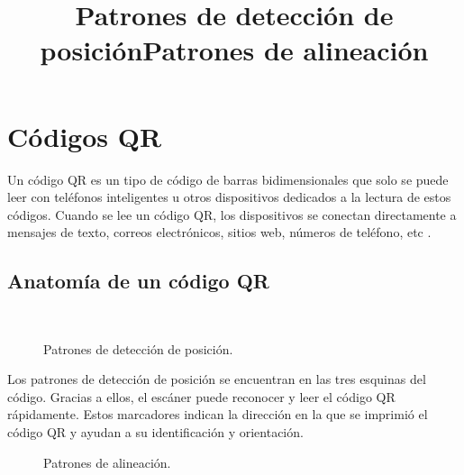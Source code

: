 
\section{Códigos QR}
Un código QR es un tipo de código de barras bidimensionales que solo se puede leer con teléfonos inteligentes u otros dispositivos dedicados a la lectura de estos códigos. Cuando se lee un código QR, los dispositivos se conectan directamente a mensajes de texto, correos electrónicos, sitios web, números de teléfono, etc \cite{ref10}.

\subsection{Anatomía de un código QR}
\title{Patrones de detección de posición}\\

\begin{figure}[htbp]
	\begin{center}
		\caption{Patrones de detección de posición.}
		\label{fig:casosDeUso}
	\end{center}
\end{figure}

Los patrones de detección de posición se encuentran en las tres esquinas del código. Gracias a ellos, el escáner puede reconocer y leer el código QR rápidamente. Estos marcadores indican la dirección en la que se imprimió el código QR y ayudan a su identificación y orientación. \\

\title{Patrones de alineación}

\begin{figure}[htbp]
	\begin{center}
		\caption{Patrones de alineación.}
		\label{fig:casosDeUso}
	\end{center}
\end{figure}

